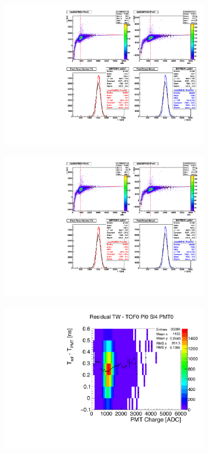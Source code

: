 \begin{figure}
  \begin{center}
  \includegraphics[clip,trim=0 8.5cm 10cm 0, width=9cm]{01_tw_example} \\
  \caption{}
  \label{fig:TW}
  \end{center}
\end{figure}

\begin{figure}
  \begin{center}
  \includegraphics[clip,trim=0 0 10cm 8.5cm, width=9cm]{02_slab_dt_resolution_tw_effect} \\
  \caption{}
  \label{fig:SlabDTTW}
  \end{center}
\end{figure}

\begin{figure}
  \begin{center}
  \includegraphics[width=9cm]{03_residual_tw_example} \\
  \caption{}
  \label{fig:ResTW}
  \end{center}
\end{figure}



